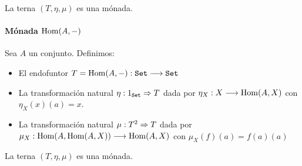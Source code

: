 La terna $(T, \eta, \mu)$ es una mónada.


\paragraph{Mónada $\operatorname{Hom}(A, -)$}
Sea $A$ un conjunto. Definimos:

\begin{itemize}
\item El endofuntor $T = \operatorname{Hom}(A, -) : \texttt{Set}\longrightarrow \texttt{Set}$
\item La transformación natural $\eta : 1_{\texttt{Set}}\Rightarrow T$ dada
  por $\eta_X : X\longrightarrow \operatorname{Hom}(A, X)$ con $\eta_X(x)(a) = x$.
\item La transformación natural $\mu: T^2\Rightarrow T$ dada por
  $\mu_X : \operatorname{Hom}(A, \operatorname{Hom}(A, X))\longrightarrow \operatorname{Hom}(A, X)$ con
  $\mu_X(f)(a) = f(a)(a)$
\end{itemize}

La terna $(T, \eta, \mu)$ es una mónada.

